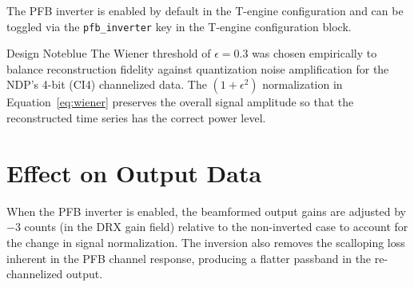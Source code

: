 The PFB inverter is enabled by default in the T-engine configuration and can be toggled via the \texttt{pfb\_inverter} key in the T-engine configuration block.

\begin{calloutBox}{Design Note}{blue}
The Wiener threshold of $\epsilon = 0.3$ was chosen empirically to balance reconstruction fidelity against quantization noise amplification for the NDP's 4-bit (CI4) channelized data.  The $(1+\epsilon^2)$ normalization in Equation~\ref{eq:wiener} preserves the overall signal amplitude so that the reconstructed time series has the correct power level.
\end{calloutBox}

\section{Effect on Output Data}

When the PFB inverter is enabled, the beamformed output gains are adjusted by $-3$ counts (in the DRX gain field) relative to the non-inverted case to account for the change in signal normalization.  The inversion also removes the scalloping loss inherent in the PFB channel response, producing a flatter passband in the re-channelized output.
